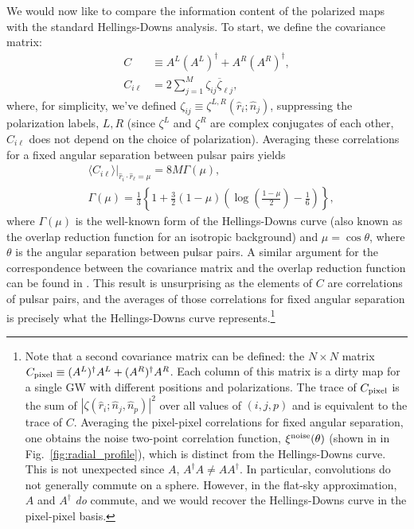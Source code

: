 \documentclass[%
 reprint,
nofootinbib,
 amsmath,amssymb,
 aps,
]{revtex4-2}
\begin{document}
We would now like to compare the information content of the polarized maps with the standard Hellings-Downs analysis. To start, we define the covariance matrix:
\begin{align}
    C &\equiv A^L (A^L)^\dagger + A^R (A^R)^\dagger, \\
    C_{i\ell} &= 2 \sum_{j=1}^M \zeta_{ij}\overline{\zeta}_{\ell j},
\end{align}
where, for simplicity, we've defined $\zeta_{ij}\equiv\zeta^{L,R}(\hat{r}_i;\hat{n}_j)$, suppressing the polarization labels, $L, R$ (since $\zeta^L$ and $\zeta^R$ are complex conjugates of each other, $C_{i\ell}$ does not depend on the choice of polarization). Averaging these correlations for a fixed angular separation between pulsar pairs yields
\begin{align}
    &\langle C_{i\ell}\rangle \big|_{\hat{r}_i \cdot \hat{r}_\ell = \mu} = 8 M \Gamma(\mu), \\
    &\Gamma(\mu) = \frac{1}{3} \left\{ 1 + \frac{3}{2} (1 - \mu) \left(\log(\frac{1 - \mu}{2}) - \frac{1}{6} \right)\right\},
\end{align}
where $\Gamma(\mu)$ is the well-known form of the Hellings-Downs curve (also known as the overlap reduction function for an isotropic background) and $\mu = \cos\theta$, where $\theta$ is the angular separation between pulsar pairs. A similar argument for the correspondence between the covariance matrix and the overlap reduction function can be found in \citep{2020PhRvD.102h4039T}. This result is unsurprising as the elements of $C$ are correlations of pulsar pairs, and the averages of those correlations for fixed angular separation is precisely what the Hellings-Downs curve represents.\footnote{Note that a second covariance matrix can be defined: the $N \times N$ matrix $C_{\rm pixel} \equiv  (A^L)^\dagger A^L  + (A^R)^\dagger A^R $.  Each column of this matrix is a dirty map for a single GW with different positions and polarizations.  The trace of $C_{\rm pixel}$ is the sum of $|\zeta(\hat{r}_i;\hat{n}_j,\hat{n}_p)|^2$ over all values of $(i,j,p)$ and is equivalent to the trace of $C$.  Averaging the pixel-pixel correlations for fixed angular separation, one obtains the noise two-point correlation function, $\xi^{\rm noise}(\theta)$ (shown in in Fig.~\ref{fig:radial_profile}), which is distinct from the Hellings-Downs curve.  This is not unexpected since $A$, $A^{\dagger} A \neq A A ^{\dagger}$. In particular, convolutions do not generally commute on a sphere.  However, in the flat-sky approximation, $A$ and $A^\dagger$ \textit{do} commute, and we would recover the Hellings-Downs curve in the pixel-pixel basis.}
\end{document}
